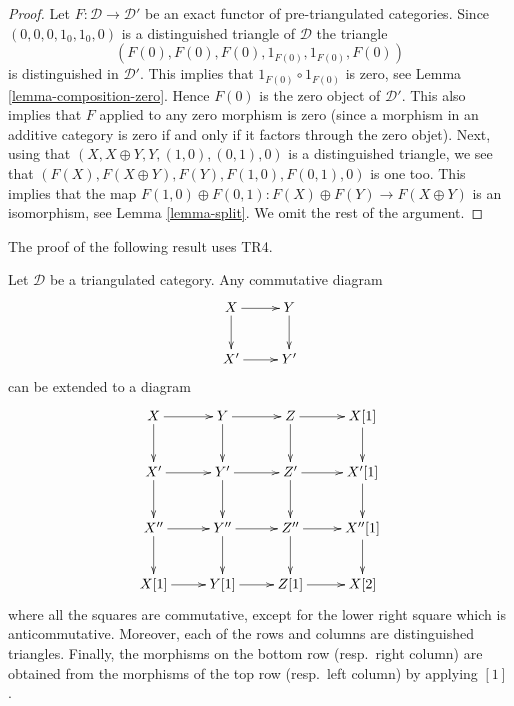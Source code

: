 \begin{proof}
Let $F : \mathcal{D} \to \mathcal{D}'$ be an exact functor of
pre-triangulated categories. Since
$(0, 0, 0, 1_0, 1_0, 0)$ is a distinguished triangle of $\mathcal{D}$
the triangle
$$
(F(0), F(0), F(0), 1_{F(0)}, 1_{F(0)}, F(0))
$$
is distinguished in $\mathcal{D}'$.
This implies that $1_{F(0)} \circ 1_{F(0)}$ is zero, see
Lemma \ref{lemma-composition-zero}.
Hence $F(0)$ is the zero object of $\mathcal{D}'$. This also implies
that $F$ applied to any zero morphism is zero (since a morphism in
an additive category is zero if and only if it factors through the
zero objet). Next, using that
$(X, X \oplus Y, Y, (1, 0), (0, 1), 0)$ is a distinguished triangle,
we see that $(F(X), F(X \oplus Y), F(Y), F(1, 0), F(0, 1), 0)$ is
one too. This implies that the map
$F(1, 0) \oplus F(0, 1) : F(X) \oplus F(Y) \to F(X \oplus Y)$
is an isomorphism, see
Lemma \ref{lemma-split}.
We omit the rest of the argument.
\end{proof}

\noindent
The proof of the following result uses TR4.

\begin{proposition}
\label{proposition-9}
Let $\mathcal{D}$ be a triangulated category. Any commutative diagram
$$
\xymatrix{
X \ar[r] \ar[d] & Y \ar[d] \\
X' \ar[r] & Y'
}
$$
can be extended to a diagram
$$
\xymatrix{
X \ar[r] \ar[d] & Y \ar[r] \ar[d] & Z \ar[r] \ar[d] & X[1] \ar[d] \\
X' \ar[r] \ar[d] & Y' \ar[r] \ar[d] & Z' \ar[r] \ar[d] & X'[1] \ar[d] \\
X'' \ar[r] \ar[d] & Y'' \ar[r] \ar[d] & Z'' \ar[r] \ar[d] & X''[1] \ar[d] \\
X[1] \ar[r] & Y[1] \ar[r] & Z[1] \ar[r] & X[2]
}
$$
where all the squares are commutative, except for the lower right square
which is anticommutative. Moreover, each of the rows and columns are
distinguished triangles. Finally, the morphisms on the bottom row
(resp.\ right column) are obtained from the morphisms of the top row
(resp.\ left column) by applying $[1]$.
\end{proposition}

